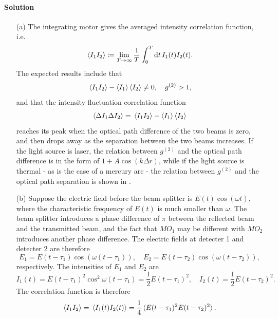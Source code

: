 \documentclass[hyperref, a4paper]{article}
\begin{document}
\paragraph{Solution} \begin{itemize}
    \item[(a)] The integrating motor gives the averaged intensity correlation function, i.e.
    \begin{equation}
        \expval*{I_1 I_2} \coloneqq \lim_{T \to \infty} \frac{1}{T} \int_0^T \dd{t} I_1(t) I_2(t). 
    \end{equation} 
    The expected results include that
    \begin{equation}
        \expval*{I_1 I_2} - \expval{I_1} \expval{I_2} \neq 0, \quad g^{(2)} > 1,
    \end{equation} 
    and that the intensity fluctuation correlation function 
    \begin{equation}
        \expval{\Delta I_1 \Delta I_2} = \expval*{I_1 I_2} - \expval{I_1} \expval{I_2}
    \end{equation}
    reaches its peak when the optical path difference of the two beams is zero, and then drops away as the separation between the two beams increases. 
    If the light source is laser, the relation between $g^{(2)}$ and the optical path difference is in the form of $1 + A \cos(k \Delta r)$, while if the light source is thermal - as is the case of a mercury arc - the relation between $g^{(2)}$ and the optical path separation is shown in .
    \item[(b)] Suppose the electric field before the beam splitter is $E(t) \cos(\omega t)$, where the characteristic frequency of $E(t)$ is much smaller than $\omega$.
    The beam splitter introduces a phase difference of $\pi$ between the reflected beam and the transmitted beam, and the fact that $MO_1$ may be different with $MO_2$ introduces another phase difference.
    The electric fields at detecter 1 and detecter 2 are therefore 
    \begin{equation}
        E_1 = E(t - \tau_1) \cos(\omega (t - \tau_1)), \quad E_2 = E(t - \tau_2) \cos(\omega (t - \tau_2)),
    \end{equation}
    respectively.
    The intensities of $E_1$ and $E_2$ are 
    \begin{equation}
        I_1(t) = \overline{E(t - \tau_1)^2 \cos^2 \omega(t - \tau_1)} = \frac{1}{2} E(t - \tau_1)^2, \quad I_2(t) = \frac{1}{2} E(t - \tau_2)^2.
    \end{equation}
    The correlation function is therefore 
    \begin{equation}
        \expval{I_1 I_2} = \expval*{ I_1(t) I_2(t) } = \frac{1}{4} \expval*{E(t - \tau_1)^2 E(t - \tau_2)^2}.
    \end{equation}
    

\end{itemize}
\end{document}
